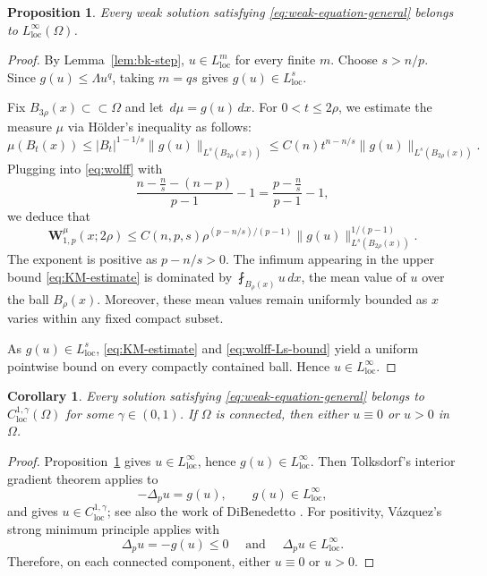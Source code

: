\documentclass[reqno,12pt]{amsart}
\numberwithin{equation}{section}
\newtheorem{prop}[thm]{Proposition}
\newtheorem{cor}[thm]{Corollary}
\theoremstyle{remark}
\newcommand{\dd}{\,d}
\newcommand{\loc}{\mathrm{loc}}
\newcommand{\Wolff}{\mathbf W}
\begin{document}
\begin{prop} \label{prop:local-boundedness}
Every weak solution satisfying \eqref{eq:weak-equation-general} belongs to
$L^\infty_{\loc}(\Omega)$.
\end{prop}

\begin{proof}
By Lemma~\ref{lem:bk-step}, $u\in L^m_{\loc}$ for every finite $m$.  Choose $s>n/p$.  Since $g(u)\le\Lambda u^q$, taking $m=qs$ gives $g(u)\in L^s_{\loc}$.

Fix $B_{3\rho}(x)\subset\subset\Omega$ and let $\dd\mu=g(u)\dd x$.  For $0<t\le2\rho$, we estimate the measure $\mu$ via H\"older's inequality as follows: 
$$
 \mu(B_t(x)) \le |B_t|^{1-1/s}\|g(u)\|_{L^s(B_{2\rho}(x))}
 \le C(n) t^{n-n/s}\|g(u)\|_{L^s(B_{2\rho}(x))}.
$$
Plugging into \eqref{eq:wolff} with
$$\frac{n-\frac n s -(n-p)}{p-1} -1=\frac{p-\frac n s}{p-1}-1, $$
we deduce that
\begin{equation}\label{eq:wolff-Ls-bound}
 \Wolff_{1,p}^{\mu}(x;2\rho) \le C(n,p,s)\rho^{(p-n/s)/(p-1)}
 \|g(u)\|_{L^s(B_{2\rho}(x))}^{1/(p-1)}.
\end{equation}
The exponent is positive as $p-n/s>0$. The infimum appearing in the upper bound \eqref{eq:KM-estimate} is dominated by  
$\fint_{B_\rho(x)} u\,dx$, the mean value of $u$ over the ball $B_\rho(x)$.  Moreover, these mean values remain uniformly bounded as $x$ varies within any fixed compact subset.

As $g(u)\in L^s_{\loc}$, \eqref{eq:KM-estimate} and \eqref{eq:wolff-Ls-bound} yield a uniform pointwise bound on every compactly contained ball.  Hence $u\in L^\infty_{\loc}$.
\end{proof}

\begin{cor} \label{cor:C1-regularity}
Every solution satisfying \eqref{eq:weak-equation-general} belongs to $C^{1,\gamma}_{\loc}(\Omega)$ for some $\gamma\in(0,1)$.  If $\Omega$ is connected, then either $u\equiv0$ or $u>0$ in $\Omega$.
\end{cor}

\begin{proof}
Proposition~\ref{prop:local-boundedness} gives $u\in L^\infty_{\loc}$, hence $g(u)\in L^\infty_{\loc}$.  Then Tolksdorf's interior gradient theorem \cite{T1984} applies to
$$
-\Delta_pu=g(u),\qquad g(u)\in L^\infty_{\loc},
$$
and gives $u\in C^{1,\gamma}_{\loc}$; see also the work of DiBenedetto \cite{D1983}. For positivity, V\'azquez's strong minimum principle \cite[Theorem~5]{V1984} applies with
$$
\Delta_pu=-g(u)\le0 \quad \text{ and }
\quad \Delta_pu\in L^\infty_{\loc} .
$$
Therefore, on each connected component, either $u\equiv0$ or $u>0$.
\end{proof}
\end{document}
